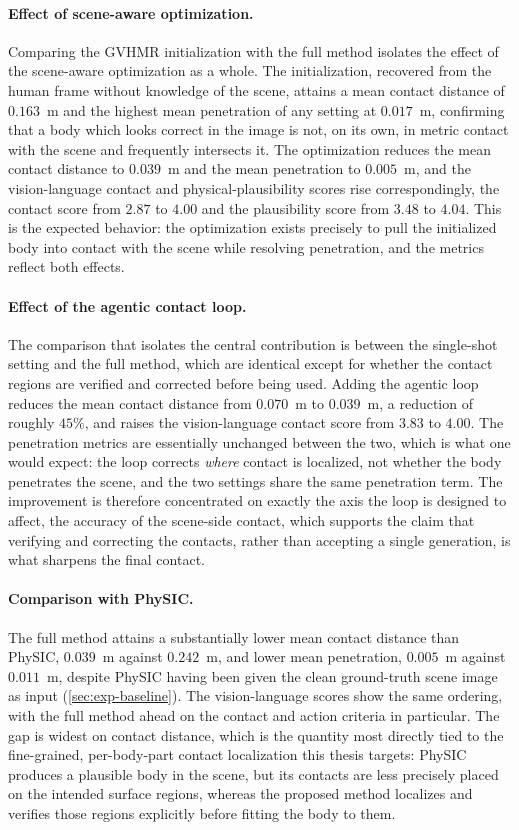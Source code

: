 \paragraph{Effect of scene-aware optimization.} Comparing the GVHMR initialization with the full method isolates the effect of the scene-aware optimization as a whole. The initialization, recovered from the human frame without knowledge of the scene, attains a mean contact distance of $0.163$~m and the highest mean penetration of any setting at $0.017$~m, confirming that a body which looks correct in the image is not, on its own, in metric contact with the scene and frequently intersects it. The optimization reduces the mean contact distance to $0.039$~m and the mean penetration to $0.005$~m, and the vision-language contact and physical-plausibility scores rise correspondingly, the contact score from $2.87$ to $4.00$ and the plausibility score from $3.48$ to $4.04$. This is the expected behavior: the optimization exists precisely to pull the initialized body into contact with the scene while resolving penetration, and the metrics reflect both effects.

\paragraph{Effect of the agentic contact loop.} The comparison that isolates the central contribution is between the single-shot setting and the full method, which are identical except for whether the contact regions are verified and corrected before being used. Adding the agentic loop reduces the mean contact distance from $0.070$~m to $0.039$~m, a reduction of roughly $45\%$, and raises the vision-language contact score from $3.83$ to $4.00$. The penetration metrics are essentially unchanged between the two, which is what one would expect: the loop corrects \emph{where} contact is localized, not whether the body penetrates the scene, and the two settings share the same penetration term. The improvement is therefore concentrated on exactly the axis the loop is designed to affect, the accuracy of the scene-side contact, which supports the claim that verifying and correcting the contacts, rather than accepting a single generation, is what sharpens the final contact.

\paragraph{Comparison with PhySIC.} The full method attains a substantially lower mean contact distance than PhySIC, $0.039$~m against $0.242$~m, and lower mean penetration, $0.005$~m against $0.011$~m, despite PhySIC having been given the clean ground-truth scene image as input (\cref{sec:exp-baseline}). The vision-language scores show the same ordering, with the full method ahead on the contact and action criteria in particular. The gap is widest on contact distance, which is the quantity most directly tied to the fine-grained, per-body-part contact localization this thesis targets: PhySIC produces a plausible body in the scene, but its contacts are less precisely placed on the intended surface regions, whereas the proposed method localizes and verifies those regions explicitly before fitting the body to them.

